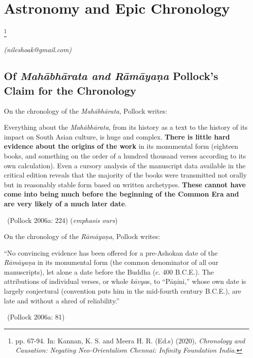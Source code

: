 
\chapter{Astronomy and Epic Chronology}\label{chapter2}

\footnote{pp. 67-94. In: Kannan, K. S. and Meera H. R. (Ed.s) (2020), \textit{Chronology and Causation: Negating Neo-Orientalism Chennai: Infinity Foundation India.}}

\begin{flushright}
\textit{(nileshoak@gmail.com)}
\end{flushright}


\section*{Of \textit{Mahābhārata and Rāmāyaṇa} Pollock’s Claim for the Chronology}

On the chronology of the \textit{Mahābhārata}, Pollock writes:

\begin{myquote}
Everything about the \textit{Mahābhārata}, from its history as a text to the history of its impact on South Asian culture, is huge and complex. \textbf{There is little hard evidence about the origins of the work} in its monumental form (eighteen books, and something on the order of a hundred thousand verses according to its own calculation). Even a cursory analysis of the manuscript data available in the critical edition reveals that the majority of the books were transmitted not orally but in reasonably stable form based on written archetypes.\textbf{ These cannot have come into being much before the beginning of the Common Era and are very likely of a much later date}. 

~\hfill (Pollock 2006a: 224) (\textit{emphasis ours})
\end{myquote}

On the chronology of the \textit{Rāmāyaṇa}, Pollock writes:

\begin{myquote}
“No convincing evidence has been offered for a pre-Ashokan date of the \textit{Rāmāyaṇa} in its monumental form (the common denominator of all our manuscripts), let alone a date before the Buddha (c. 400 B.C.E.). The attributions of individual verses, or whole \textit{kāvya}s, to “Pāṇini,” whose own date is largely conjectural (convention puts him in the mid-fourth century B.C.E.), are late and without a shred of reliability.” 

~\hfill (Pollock 2006a: 81)
\end{myquote}

